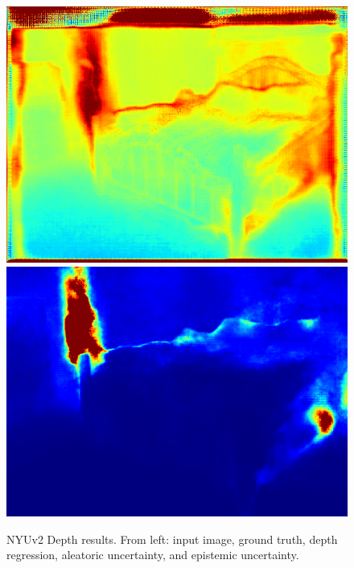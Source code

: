\begin{figure}[p]
{\includegraphics[width=0.3\linewidth,trim={40 10 40 60},clip]{segnet_139_output_3.png}
\includegraphics[width=0.3\linewidth]{segnet_139_output_4.png}}
\caption[NYUv2 Depth results.]{NYUv2 Depth results. From left: input image, ground truth, depth regression, aleatoric uncertainty, and epistemic uncertainty.}
\label{fig:nyud_qual}


\end{figure}
